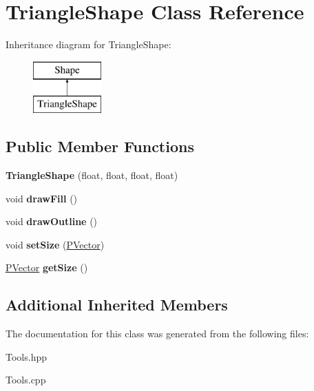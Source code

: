 \hypertarget{class_triangle_shape}{}\section{Triangle\+Shape Class Reference}
\label{class_triangle_shape}
Inheritance diagram for Triangle\+Shape\+:\begin{figure}[H]
\begin{center}
\leavevmode
\includegraphics[height=2.000000cm]{class_triangle_shape}
\end{center}
\end{figure}
\subsection*{Public Member Functions}
\begin{DoxyCompactItemize}
\item 
\hypertarget{class_triangle_shape_a0742fc5cefcf87ec714df887eac1063b}{}\label{class_triangle_shape_a0742fc5cefcf87ec714df887eac1063b} 
{\bfseries Triangle\+Shape} (float, float, float, float)
\item 
\hypertarget{class_triangle_shape_a1405e2b1b5d9c9e8283156eec6cbf021}{}\label{class_triangle_shape_a1405e2b1b5d9c9e8283156eec6cbf021} 
void {\bfseries draw\+Fill} ()
\item 
\hypertarget{class_triangle_shape_add481f7167360aeeaf411d714c9d68be}{}\label{class_triangle_shape_add481f7167360aeeaf411d714c9d68be} 
void {\bfseries draw\+Outline} ()
\item 
\hypertarget{class_triangle_shape_abd78b976444ddf526b839a5d4706ff5c}{}\label{class_triangle_shape_abd78b976444ddf526b839a5d4706ff5c} 
void {\bfseries set\+Size} (\hyperlink{struct_p_vector}{P\+Vector})
\item 
\hypertarget{class_triangle_shape_aa0d2b84703d859f14c73023315bd3896}{}\label{class_triangle_shape_aa0d2b84703d859f14c73023315bd3896} 
\hyperlink{struct_p_vector}{P\+Vector} {\bfseries get\+Size} ()
\end{DoxyCompactItemize}
\subsection*{Additional Inherited Members}


The documentation for this class was generated from the following files\+:\begin{DoxyCompactItemize}
\item 
Tools.\+hpp\item 
Tools.\+cpp\end{DoxyCompactItemize}
